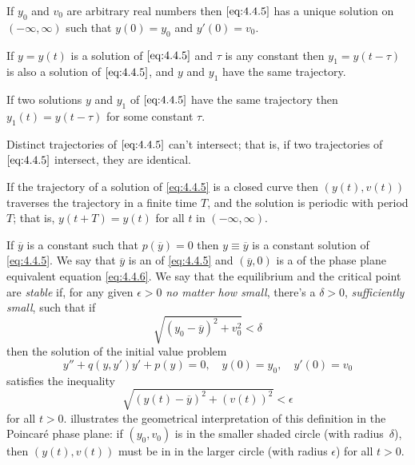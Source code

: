 \begin{enumext}[
  label=\arabic*,
  wrap-label={Statement #1.},
  labelwidth=6em,
  list-indent=0pt]
\item If $y_0$ and $v_0$ are arbitrary real numbers then
$\eqref{eq:4.4.5}$ has a unique solution on $(-\infty,\infty)$ such that
$y(0)=y_0$ and $y'(0)=v_0$.

\item If $y=y(t)$ is a solution of $\eqref{eq:4.4.5}$
and
$\tau$ is any constant then $y_1=y(t-\tau)$ is also a solution of
$\eqref{eq:4.4.5}$, and $y$ and $y_1$ have the same trajectory.

\item If two solutions $y$ and $y_1$ of
$\eqref{eq:4.4.5}$ have the same trajectory then  $y_1(t)=y(t-\tau)$
for some constant $\tau$.

\item Distinct trajectories of $\eqref{eq:4.4.5}$ can't
intersect; that is, if two trajectories of $\eqref{eq:4.4.5}$
intersect,  they are identical.

\item If the trajectory of a solution of
\eqref{eq:4.4.5}
is a closed curve then  $(y(t),v(t))$ traverses the
trajectory in a finite time $T$, and the solution is periodic with
period $T$; that is, $y(t+T)=y(t)$ for all $t$ in $(-\infty,\infty)$.
\end{enumext}


If $\overline y$ is a constant such that $p(\overline y)=0$ then
$y\equiv\overline y$ is a constant solution of \eqref{eq:4.4.5}. We say
that $\overline y$ is an  of \eqref{eq:4.4.5} and
 $(\overline y,0)$ is a  of the phase plane
equivalent equation \eqref{eq:4.4.6}. We say that the equilibrium and
the critical point are \emph{\color{blue}stable} if, for any given $\epsilon>0$
\emph{\color{blue}no matter how small}, there's a $\delta>0$,
\emph{\color{blue}sufficiently small}, such that if
\[
\sqrt{(y_0-\overline y)^2+v_0^2}<\delta
\]
then the  solution of the initial value problem
\[
y''+q(y,y')y'+p(y)=0,\quad y(0)=y_0,\quad y'(0)=v_0
\]
satisfies the inequality
\[
\sqrt{(y(t)-\overline y)^2+(v(t))^2}<\epsilon
\]
for all $t>0$.  illustrates the geometrical
interpretation of this definition in the Poincaré phase plane: if
$(y_0,v_0)$ is in the smaller shaded circle (with radius~$\delta$), then
$(y(t),v(t))$ must be in in the larger circle (with
radius $\epsilon$) for all $t>0$.

